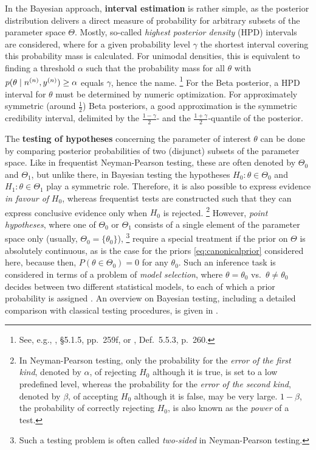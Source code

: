 In the Bayesian approach, \textbf{interval estimation} is rather simple,
as the posterior distribution delivers a direct measure of probability for arbitrary subsets of the parameter space $\Theta$.
Mostly, so-called \emph{highest posterior density} (HPD) intervals are considered,
where for a given probability level $\gamma$ the shortest interval covering this probability mass is calculated.
For unimodal densities, this is equivalent to finding a threshold $\alpha$ such that
the probability mass for all $\theta$ with $p(\theta\mid n^{(n)}, y^{(n)}) \ge \alpha$ equals $\gamma$, hence the name.%
\footnote{See, e.g., \textcite{2000:bernardosmith}, \S 5.1.5, pp.~259f, or \textcite{2007:robert}, Def.~5.5.3, p.~260.}
For the Beta posterior, a HPD interval for $\theta$ must be determined by numeric optimization.
For approximately symmetric (around $\frac{1}{2}$) Beta posteriors, a good approximation is the symmetric credibility interval,
delimited by the $\frac{1-\gamma}{2}$- and the $\frac{1+\gamma}{2}$-quantile of the posterior.

The \textbf{testing of hypotheses} concerning the parameter of interest $\theta$ can be done
by comparing posterior probabilities of two (disjunct) subsets of the parameter space.
Like in frequentist Neyman-Pearson testing, these are often denoted by $\Theta_0$ and $\Theta_1$,
but unlike there, in Bayesian testing the hypotheses $H_0: \theta \in \Theta_0$ and $H_1: \theta \in \Theta_1$ play a symmetric role.
Therefore, it is also possible to express evidence \emph{in favour of} $H_0$,
whereas frequentist tests are constructed such that they can express conclusive evidence only when $H_0$ is rejected.%
\footnote{In Neyman-Pearson testing, only the probability
for the \emph{error of the first kind}, denoted by $\alpha$, of rejecting $H_0$ although it is true, is set to a low predefined level,
whereas the probability for the \emph{error of the second kind}, denoted by $\beta$, of accepting $H_0$ although it is false, may be very large.
$1-\beta$, the probability of correctly rejecting $H_0$, is also known as the \emph{power} of a test.}
However, \emph{point hypotheses}, where one of $\Theta_0$ or $\Theta_1$
consists of a single element of the parameter space only (usually, $\Theta_0 = \{\theta_0\}$),%
\footnote{Such a testing problem is often called \emph{two-sided} in Neyman-Pearson testing.}
require a special treatment if the prior on $\Theta$ is absolutely continuous,
as is the case for the priors \eqref{eq:canonicalprior} considered here,
because then, $P(\theta \in \Theta_0) = 0$ for any $\theta_0$.
Such an inference task is considered in terms of a problem of \emph{model selection},
where $\theta = \theta_0$ vs.\ $\theta \neq \theta_0$ decides between two different statistical models,
to each of which a prior probability is assigned \parencite[\S 5.2.4]{2007:robert}.
An overview on Bayesian testing, including a detailed comparison with classical testing procedures,
is given in \textcite[\S 5.2--5.4]{2007:robert}.

